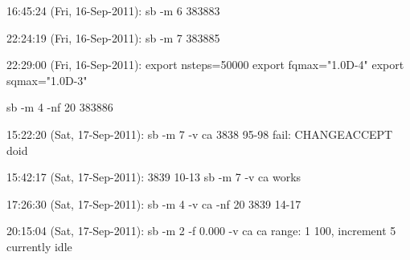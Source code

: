 16:45:24 (Fri, 16-Sep-2011):
	sb -m 6
	383883
	
22:24:19 (Fri, 16-Sep-2011):
	sb -m 7
	383885

22:29:00 (Fri, 16-Sep-2011):
	export nsteps=50000
	export fqmax="1.0D-4"
	export sqmax="1.0D-3"

	sb -m 4 -nf 20
	383886

15:22:20 (Sat, 17-Sep-2011):
	sb -m 7 -v ca
	3838 95-98
	fail: CHANGEACCEPT doid

15:42:17 (Sat, 17-Sep-2011):
	3839 10-13
	sb -m 7 -v ca
	works

17:26:30 (Sat, 17-Sep-2011):
	sb -m 4 -v ca -nf 20
	3839 14-17

20:15:04 (Sat, 17-Sep-2011):
	sb -m 2 -f 0.000 -v ca 
	ca range:
	1 100, increment 5
	currently idle
	
